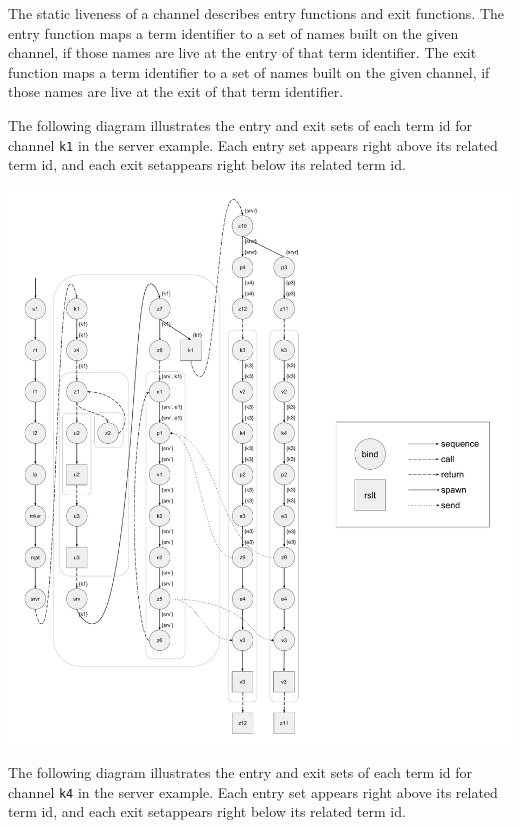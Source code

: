\documentclass[10pt]{article}
\begin{document}
The static liveness of a channel describes entry functions and exit functions.
The entry function maps a term identifier to a set of names built on
the given channel, if those names are live at the entry of that term identifier.
The exit function maps a term identifier to a
set of names built on the given channel, if those names are live at the exit of that
term identifier.

\newpage

The following diagram illustrates the entry and exit sets of each term id
for channel \lstinline{k1} in
the server example.  Each entry set appears right above its related term id,
and each exit setappears right below its related term id. 

\includegraphics[width=1\textwidth]{cml-liveness-analysis-k1.pdf}

\newpage

The following diagram illustrates the entry and exit sets of each term id
for channel \lstinline{k4} in
the server example.  Each entry set appears right above its related term id,
and each exit setappears right below its related term id. 
\end{document}
